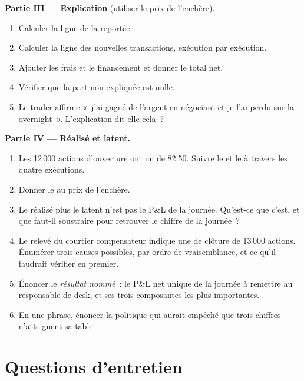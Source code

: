 \begin{problem}
\medskip\noindent\textbf{Partie III --- Explication} (utiliser le prix de l'enchère).
\begin{enumerate}[resume]
\item Calculer la ligne de la  reportée.
\item Calculer la ligne des nouvelles transactions, exécution par exécution.
\item Ajouter les frais et le financement et donner le total net.
\item Vérifier que la part non expliquée est nulle.
\item Le trader affirme «~j'ai gagné de l'argent en négociant et je l'ai perdu sur la
 overnight~». L'explication dit-elle cela~?
\end{enumerate}

\medskip\noindent\textbf{Partie IV --- Réalisé et latent.}
\begin{enumerate}[resume]
\item Les 12\,000 actions d'ouverture ont un  de 82.50. Suivre le
 et le  à travers les quatre exécutions.
\item Donner le  au prix de l'enchère.
\item Le réalisé plus le latent n'est pas le P\&L de la journée. Qu'est-ce que c'est, et que
faut-il soustraire pour retrouver le chiffre de la journée~?
\item Le relevé du courtier compensateur indique une  de clôture de 13\,000
actions. Énumérer trois causes possibles, par ordre de vraisemblance, et ce qu'il faudrait
vérifier en premier.
\item Énoncer le \emph{résultat nommé}~: le P\&L net unique de la journée à remettre
au responsable de desk, et ses trois composantes les plus importantes.
\item En une phrase, énoncer la politique qui aurait empêché que trois chiffres
n'atteignent sa table.
\end{enumerate}
\end{problem}

\section{Questions d'entretien}

